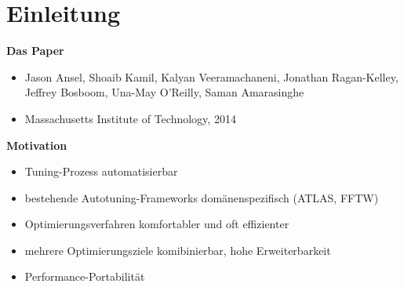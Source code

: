 
    \section{Einleitung}


  \begingroup
    \begin{frame}
    
    \textbf{Das Paper}
    \begin{itemize}
        
        \item Jason Ansel, Shoaib Kamil, Kalyan Veeramachaneni, Jonathan Ragan-Kelley, Jeffrey Bosboom, Una-May O'Reilly, Saman Amarasinghe
        
        \item Massachusetts Institute of Technology, 2014 
    \end{itemize}
    
    \text{}
    
    \textbf{Motivation}
        
    \begin{itemize}
      \item Tuning-Prozess automatisierbar
            
      \item bestehende Autotuning-Frameworks domänenspezifisch (ATLAS, FFTW) \newline

    \end{itemize}
    \begin{itemize}
      \item Optimierungsverfahren komfortabler und oft effizienter
      
      \item mehrere Optimierungsziele komibinierbar, hohe Erweiterbarkeit
      
      \item Performance-Portabilität
                  
    \end{itemize}
    \end{frame}
    \endgroup
    
